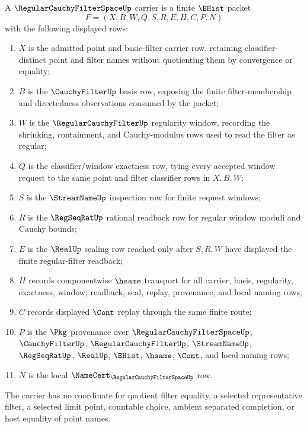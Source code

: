 \begin{definition}
\label{def:regular-cauchy-filter-space-carrier}
A $\RegularCauchyFilterSpaceUp$ carrier is a finite $\BHist$ packet
$$
F=(X,B,W,Q,S,R,E,H,C,P,N)
$$
with the following displayed rows:
\begin{enumerate}
\item $X$ is the admitted point and basic-filter carrier row, retaining classifier-distinct point and filter names without quotienting them by convergence or equality;
\item $B$ is the $\CauchyFilterUp$ basis row, exposing the finite filter-membership and directedness observations consumed by the packet;
\item $W$ is the $\RegularCauchyFilterUp$ regularity window, recording the shrinking, containment, and Cauchy-modulus rows used to read the filter as regular;
\item $Q$ is the classifier/window exactness row, tying every accepted window request to the same point and filter classifier rows in $X,B,W$;
\item $S$ is the $\StreamNameUp$ inspection row for finite request windows;
\item $R$ is the $\RegSeqRatUp$ rational readback row for regular window moduli and Cauchy bounds;
\item $E$ is the $\RealUp$ sealing row reached only after $S,R,W$ have displayed the finite regular-filter readback;
\item $H$ records componentwise $\hsame$ transport for all carrier, basis, regularity, exactness, window, readback, seal, replay, provenance, and local naming rows;
\item $C$ records displayed $\Cont$ replay through the same finite route;
\item $P$ is the $\Pkg$ provenance over $\RegularCauchyFilterSpaceUp$, $\CauchyFilterUp$, $\RegularCauchyFilterUp$, $\StreamNameUp$, $\RegSeqRatUp$, $\RealUp$, $\BHist$, $\hsame$, $\Cont$, and local naming rows;
\item $N$ is the local $\NameCert_{\RegularCauchyFilterSpaceUp}$ row.
\end{enumerate}
The carrier has no coordinate for quotient filter equality, a selected representative filter, a selected limit point, countable choice, ambient separated completion, or host equality of point names.
\end{definition}

